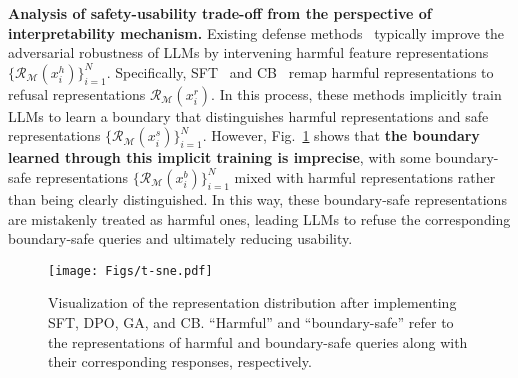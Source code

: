 \textbf{Analysis of safety-usability trade-off from the perspective of interpretability mechanism.} Existing defense methods~\cite{circuit_breaker,zou2023representation} typically improve the adversarial robustness of LLMs by intervening harmful feature representations $\{\mathcal{R}_{\mathcal{M}} \left(x_i^h \right)\}_{i=1}^N$.
Specifically, SFT~\cite{decoupled_sft} and CB~\cite{circuit_breaker} remap harmful representations to refusal representations $\mathcal{R}_{\mathcal{M}} \left(x_i^r \right)$.
%
In this process, these methods implicitly train LLMs to learn a boundary that distinguishes harmful representations and safe representations $\{\mathcal{R}_{\mathcal{M}} \left(x_i^s \right)\}_{i=1}^N$.
%
However, Fig.~\ref{figs:baseline_tsne} shows that \textbf{the boundary learned through this implicit training is imprecise}, with some boundary-safe representations $\{\mathcal{R}_{\mathcal{M}} \left(x_i^b \right)\}_{i=1}^N$ mixed with harmful representations rather than being clearly distinguished.
%
In this way, these boundary-safe representations are mistakenly treated as harmful ones, leading LLMs to refuse the corresponding boundary-safe queries and ultimately reducing usability.
%
\begin{figure}[t]
\begin{center}
\centerline{\texttt{[image: Figs/t-sne.pdf]}}
\caption{Visualization of the representation distribution after implementing SFT, DPO, GA, and CB. ``Harmful'' and ``boundary-safe'' refer to the representations of harmful and boundary-safe queries along with their corresponding responses, respectively.} 
\label{figs:baseline_tsne}
\end{center}
\vskip -0.45in
\end{figure}
